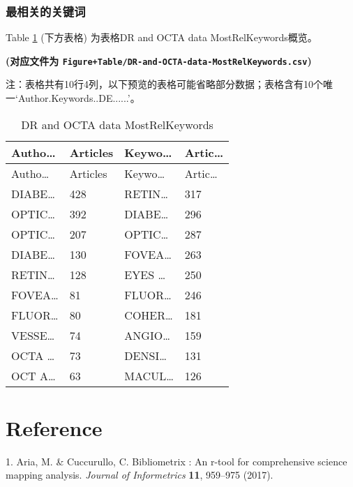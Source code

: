 \documentclass[
]{article}
\newenvironment{cslreferences}%
  {}%
  {\par}
\begin{document}
\hypertarget{ux6700ux76f8ux5173ux7684ux5173ux952eux8bcd}{%
\subsubsection{最相关的关键词}\label{ux6700ux76f8ux5173ux7684ux5173ux952eux8bcd}}

Table \ref{tab:DR-and-OCTA-data-MostRelKeywords} (下方表格) 为表格DR and OCTA data MostRelKeywords概览。

\textbf{(对应文件为 \texttt{Figure+Table/DR-and-OCTA-data-MostRelKeywords.csv})}

\begin{center}\begin{tcolorbox}[colback=gray!10, colframe=gray!50, width=0.9\linewidth, arc=1mm, boxrule=0.5pt]注：表格共有10行4列，以下预览的表格可能省略部分数据；表格含有10个唯一`Author.Keywords..DE......'。
\end{tcolorbox}
\end{center}

\begin{longtable}[]{@{}llll@{}}
\caption{\label{tab:DR-and-OCTA-data-MostRelKeywords}DR and OCTA data MostRelKeywords}\tabularnewline
\toprule
Autho\ldots{} & Articles & Keywo\ldots{} & Artic\ldots{}\tabularnewline
\midrule
\endfirsthead
\toprule
Autho\ldots{} & Articles & Keywo\ldots{} & Artic\ldots{}\tabularnewline
\midrule
\endhead
DIABE\ldots{} & 428 & RETIN\ldots{} & 317\tabularnewline
OPTIC\ldots{} & 392 & DIABE\ldots{} & 296\tabularnewline
OPTIC\ldots{} & 207 & OPTIC\ldots{} & 287\tabularnewline
DIABE\ldots{} & 130 & FOVEA\ldots{} & 263\tabularnewline
RETIN\ldots{} & 128 & EYES \ldots{} & 250\tabularnewline
FOVEA\ldots{} & 81 & FLUOR\ldots{} & 246\tabularnewline
FLUOR\ldots{} & 80 & COHER\ldots{} & 181\tabularnewline
VESSE\ldots{} & 74 & ANGIO\ldots{} & 159\tabularnewline
OCTA \ldots{} & 73 & DENSI\ldots{} & 131\tabularnewline
OCT A\ldots{} & 63 & MACUL\ldots{} & 126\tabularnewline
\bottomrule
\end{longtable}

\hypertarget{bibliography}{%
\section*{Reference}\label{bibliography}}

\hypertarget{refs}{}
\begin{cslreferences}
\leavevmode\hypertarget{ref-BibliometrixAria2017}{}%
1. Aria, M. \& Cuccurullo, C. Bibliometrix : An r-tool for comprehensive science mapping analysis. \emph{Journal of Informetrics} \textbf{11}, 959--975 (2017).
\end{cslreferences}
\end{document}

